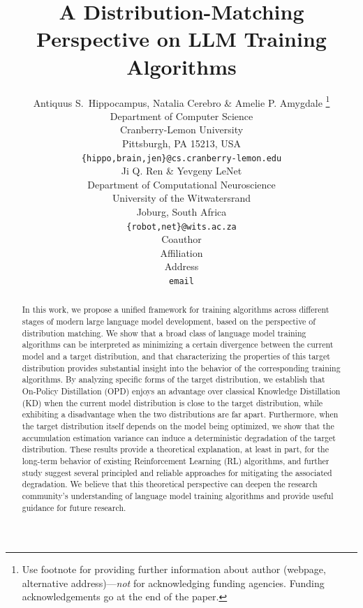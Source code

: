 \documentclass{article} %
\title{A Distribution-Matching Perspective on LLM Training Algorithms}
\author{Antiquus S.~Hippocampus, Natalia Cerebro \& Amelie P. Amygdale \thanks{ Use footnote for providing further information
about author (webpage, alternative address)---\emph{not} for acknowledging
funding agencies.  Funding acknowledgements go at the end of the paper.} \\
Department of Computer Science\\
Cranberry-Lemon University\\
Pittsburgh, PA 15213, USA \\
\texttt{\{hippo,brain,jen\}@cs.cranberry-lemon.edu} \\
\And
Ji Q. Ren \& Yevgeny LeNet \\
Department of Computational Neuroscience \\
University of the Witwatersrand \\
Joburg, South Africa \\
\texttt{\{robot,net\}@wits.ac.za} \\
\AND
Coauthor \\
Affiliation \\
Address \\
\texttt{email}
}
\begin{document}
\maketitle

\begin{abstract}
In this work, we propose a unified framework for training algorithms across different stages of modern large language model development, based on the perspective of distribution matching. We show that a broad class of language model training algorithms can be interpreted as minimizing a certain divergence between the current model and a target distribution, and that characterizing the properties of this target distribution provides substantial insight into the behavior of the corresponding training algorithms.
By analyzing specific forms of the target distribution, we establish that On-Policy Distillation (OPD) enjoys an advantage over classical Knowledge Distillation (KD) when the current model distribution is close to the target distribution, while exhibiting a disadvantage when the two distributions are far apart. Furthermore, when the target distribution itself depends on the model being optimized, we show that the accumulation estimation variance can induce a deterministic degradation of the target distribution.
These results provide a theoretical explanation, at least in part, for the long-term behavior of existing Reinforcement Learning (RL) algorithms, and further study suggest several principled and reliable approaches for mitigating the associated degradation. We believe that this theoretical perspective can deepen the research community's understanding of language model training algorithms and provide useful guidance for future research.
\end{abstract}


















\clearpage
\appendix
{}










\end{document}
